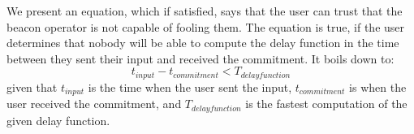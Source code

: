 We present an equation, which if satisfied, says that the user can trust that the beacon operator is not capable of fooling them.
The equation is true, if the user determines that nobody will be able to compute the delay function in the time between they sent their input and received the commitment.
It boils down to:
\begin{equation}
    t_{input} - t_{commitment} < T_{delay function}
\end{equation}
given that $t_{input}$ is the time when the user sent the input, $t_{commitment}$ is when the user received the commitment, and $T_{delay function}$ is the fastest computation of the given delay function.



